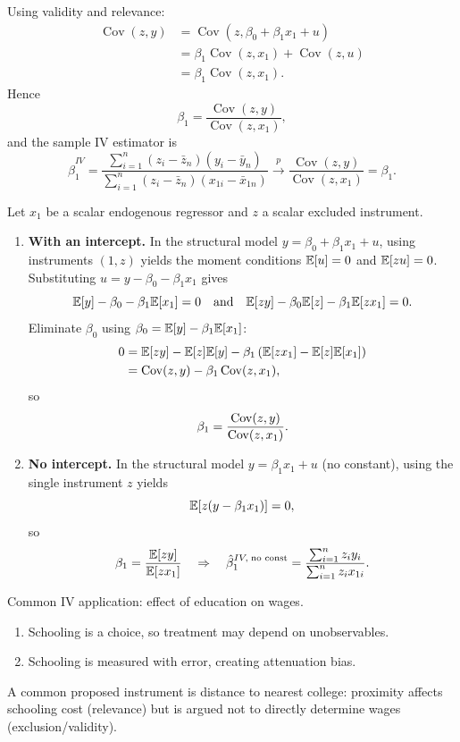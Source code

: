 \begin{proposition}
	Using validity and relevance:
	\begin{align*}
		\operatorname{Cov}(z, y)
		&= \operatorname{Cov}(z, \beta_0 + \beta_1 x_1 + u) \\
		&= \beta_1 \operatorname{Cov}(z, x_1) + \operatorname{Cov}(z, u) \\
		&= \beta_1 \operatorname{Cov}(z, x_1)
	.\end{align*}
	Hence \[
		\beta_1 = \frac{\operatorname{Cov}(z, y)}{\operatorname{Cov}(z, x_1)}
	,\]
	and the sample IV estimator is \[
		\hat{\beta}_1^{IV} = \frac{\sum_{i=1}^{n}(z_i-\bar{z}_n)(y_i-\bar{y}_n)}{\sum_{i=1}^{n}(z_i-\bar{z}_n)(x_{1i}-\bar{x}_{1n})} \xrightarrow{p} \frac{\operatorname{Cov}(z, y)}{\operatorname{Cov}(z, x_1)} = \beta_1
	.\]
\end{proposition}

\begin{proposition}
	Let $x_1$ be a scalar endogenous regressor and $z$ a scalar excluded instrument.
	\begin{enumerate}[label=(\roman*)]
		\item \textbf{With an intercept.} In the structural model $y=\beta_0+\beta_1x_1+u$, using instruments $(1,z)$ yields the moment conditions $\mathbb{E}[u]=0$ and $\mathbb{E}[zu]=0$. Substituting $u=y-\beta_0-\beta_1x_1$ gives
		\[
			\mathbb{E}[y]-\beta_0-\beta_1\mathbb{E}[x_1]=0
			\quad\text{and}\quad
			\mathbb{E}[zy]-\beta_0\mathbb{E}[z]-\beta_1\mathbb{E}[zx_1]=0
		.\]
		Eliminate $\beta_0$ using $\beta_0=\mathbb{E}[y]-\beta_1\mathbb{E}[x_1]$:
		\begin{align*}
			0
			&= \mathbb{E}[zy]-\mathbb{E}[z]\mathbb{E}[y]-\beta_1\left(\mathbb{E}[zx_1]-\mathbb{E}[z]\mathbb{E}[x_1]\right) \\
			&= \operatorname{Cov}(z,y)-\beta_1\operatorname{Cov}(z,x_1)
		,\end{align*}
		so
		\[
			\beta_1=\frac{\operatorname{Cov}(z,y)}{\operatorname{Cov}(z,x_1)}
		.\]

		\item \textbf{No intercept.} In the structural model $y=\beta_1x_1+u$ (no constant), using the single instrument $z$ yields
		\[
			\mathbb{E}\!\left[z(y-\beta_1x_1)\right]=0
		,\]
		so
		\[
			\beta_1=\frac{\mathbb{E}[zy]}{\mathbb{E}[zx_1]}
			\quad\Rightarrow\quad
			\hat{\beta}_1^{IV,\;\text{no const}}=\frac{\sum_{i=1}^{n} z_i y_i}{\sum_{i=1}^{n} z_i x_{1i}}
		.\]
	\end{enumerate}
\end{proposition}

\begin{example}
	Common IV application: effect of education on wages.
	\begin{enumerate}[label=(\roman*)]
		\item Schooling is a choice, so treatment may depend on unobservables.
		\item Schooling is measured with error, creating attenuation bias.
	\end{enumerate}
	A common proposed instrument is distance to nearest college: proximity affects schooling cost (relevance) but is argued not to directly determine wages (exclusion/validity).
\end{example}

